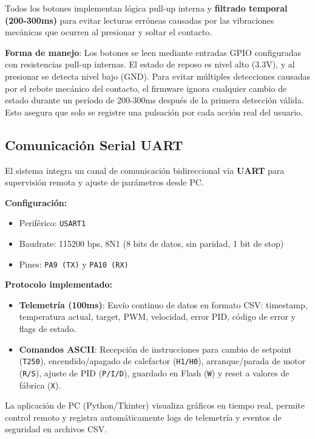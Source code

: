 \documentclass[12pt]{article}
\begin{document}
Todos los botones implementan lógica pull-up interna y \textbf{filtrado temporal (200-300ms)} para evitar lecturas erróneas causadas por las vibraciones mecánicas que ocurren al presionar y soltar el contacto.

\textbf{Forma de manejo}: Los botones se leen mediante entradas GPIO configuradas con resistencias pull-up internas. El estado de reposo es nivel alto (3.3V), y al presionar se detecta nivel bajo (GND). Para evitar múltiples detecciones causadas por el rebote mecánico del contacto, el firmware ignora cualquier cambio de estado durante un período de 200-300ms después de la primera detección válida. Esto asegura que solo se registre una pulsación por cada acción real del usuario.

\subsection{Comunicación Serial UART}
El sistema integra un canal de comunicación bidireccional vía \textbf{UART} para supervisión remota y ajuste de parámetros desde PC.

\textbf{Configuración:}
\begin{itemize}
    \item Periférico: \texttt{USART1}
    \item Baudrate: 115200 bps, 8N1 (8 bits de datos, sin paridad, 1 bit de stop)
    \item Pines: \texttt{PA9 (TX)} y \texttt{PA10 (RX)}
\end{itemize}

\textbf{Protocolo implementado:}
\begin{itemize}
    \item \textbf{Telemetría (100ms)}: Envío continuo de datos en formato CSV: timestamp, temperatura actual, target, PWM, velocidad, error PID, código de error y flags de estado.
    \item \textbf{Comandos ASCII}: Recepción de instrucciones para cambio de setpoint (\texttt{T250}), encendido/apagado de calefactor (\texttt{H1/H0}), arranque/parada de motor (\texttt{R/S}), ajuste de PID (\texttt{P/I/D}), guardado en Flash (\texttt{W}) y reset a valores de fábrica (\texttt{X}).
\end{itemize}

La aplicación de PC (Python/Tkinter) visualiza gráficos en tiempo real, permite control remoto y registra automáticamente logs de telemetría y eventos de seguridad en archivos CSV.

\end{document}
